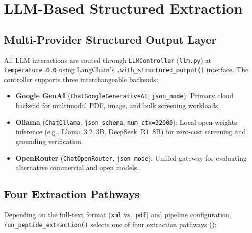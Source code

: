 \section{LLM-Based Structured Extraction}
\label{sec:extraction}

\subsection{Multi-Provider Structured Output Layer}
All LLM interactions are routed through \texttt{LLMController} (\texttt{llm.py}) at \texttt{temperature=0.0} using LangChain's \texttt{.with\_structured\_output()} interface. The controller supports three interchangeable backends:
\begin{itemize}
    \item \textbf{Google GenAI} (\texttt{ChatGoogleGenerativeAI}, \texttt{json\_mode}): Primary cloud backend for multimodal PDF, image, and bulk screening workloads.
    \item \textbf{Ollama} (\texttt{ChatOllama}, \texttt{json\_schema}, \texttt{num\_ctx=32000}): Local open-weights inference (e.g., Llama~3.2~3B, DeepSeek~R1~8B) for zero-cost screening and grounding verification.
    \item \textbf{OpenRouter} (\texttt{ChatOpenRouter}, \texttt{json\_mode}): Unified gateway for evaluating alternative commercial and open models.
\end{itemize}

\subsection{Four Extraction Pathways}
Depending on the full-text format (\texttt{xml} vs.\ \texttt{pdf}) and pipeline configuration, \texttt{run\_peptide\_extraction()} selects one of four extraction pathways ():

